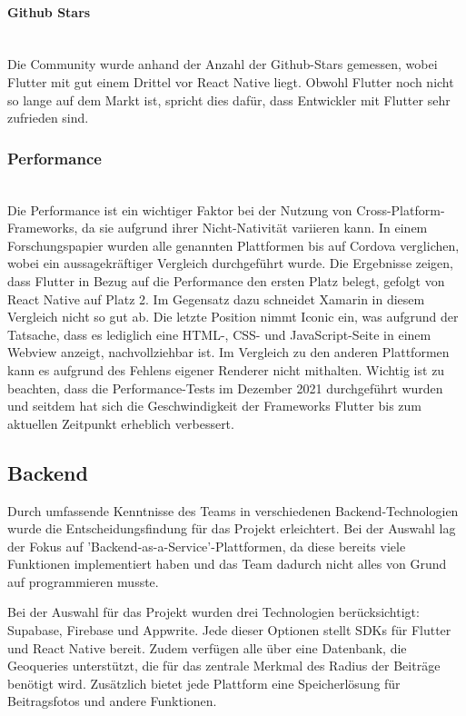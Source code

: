 \paragraph{Github Stars}\mbox{} \\
Die Community wurde anhand der Anzahl der Github-Stars gemessen, wobei Flutter mit gut einem Drittel vor React Native liegt. Obwohl Flutter noch nicht so lange auf dem Markt ist, spricht dies dafür, dass Entwickler mit Flutter sehr zufrieden sind.

\subsubsection{Performance}\mbox{} \\
Die Performance ist ein wichtiger Faktor bei der Nutzung von Cross-Platform-Frameworks, da sie aufgrund ihrer Nicht-Nativität variieren kann. In einem Forschungspapier \cite{Anwar2021} wurden alle genannten Plattformen bis auf Cordova verglichen, wobei ein aussagekräftiger Vergleich durchgeführt wurde. Die Ergebnisse zeigen, dass Flutter in Bezug auf die Performance den ersten Platz belegt, gefolgt von React Native auf Platz 2. Im Gegensatz dazu schneidet Xamarin in diesem Vergleich nicht so gut ab. Die letzte Position nimmt Iconic ein, was aufgrund der Tatsache, dass es lediglich eine HTML-, CSS- und JavaScript-Seite in einem Webview anzeigt, nachvollziehbar ist. Im Vergleich zu den anderen Plattformen kann es aufgrund des Fehlens eigener Renderer nicht mithalten.
Wichtig ist zu beachten, dass die Performance-Tests im Dezember 2021 durchgeführt wurden und seitdem hat sich die Geschwindigkeit der Frameworks Flutter bis zum aktuellen Zeitpunkt erheblich verbessert.


\subsection
{Backend}
Durch umfassende Kenntnisse des Teams in verschiedenen Backend-Technologien wurde die Entscheidungsfindung für das Projekt erleichtert. Bei der Auswahl lag der Fokus auf 'Backend-as-a-Service'-Plattformen, da diese bereits viele Funktionen implementiert haben und das Team dadurch nicht alles von Grund auf programmieren musste.

Bei der Auswahl für das Projekt wurden drei Technologien berücksichtigt: Supabase, Firebase und Appwrite. Jede dieser Optionen stellt SDKs für Flutter und React Native bereit. Zudem verfügen alle über eine Datenbank, die Geoqueries unterstützt, die für das zentrale Merkmal des Radius der Beiträge benötigt wird. Zusätzlich bietet jede Plattform eine Speicherlösung für Beitragsfotos und andere Funktionen.

